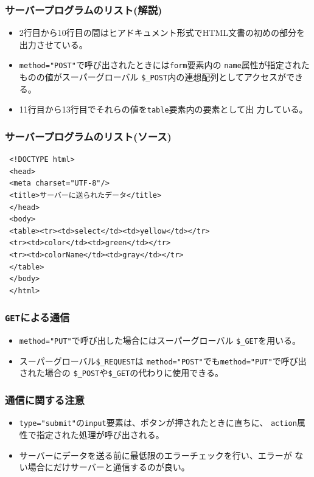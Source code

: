  \begin{frame}[containsverbatim]
 \frametitle{サーバープログラムのリスト(解説)}
 \begin{itemize}
 \item 2行目から10行目の間はヒアドキュメント形式でHTML文書の初めの部分を
       出力させている。
 \item \verb+method="POST"+で呼び出されたときには\texttt{form}要素内の
       \texttt{name}属性が指定されたものの値がスーパーグローバル
       \verb+$_POST+内の連想配列としてアクセスができる。
 \item 11行目から13行目でそれらの値を\texttt{table}要素内の要素として出
       力している。
 \end{itemize}
 \end{frame}
 \begin{frame}[containsverbatim]
 \frametitle{サーバープログラムのリスト(ソース)}
 \begin{Verbatim}
 <!DOCTYPE html>
 <head>
 <meta charset="UTF-8"/>
 <title>サーバーに送られたデータ</title>
 </head>
 <body>
 <table><tr><td>select</td><td>yellow</td></tr>
 <tr><td>color</td><td>green</td></tr>
 <tr><td>colorName</td><td>gray</td></tr>
 </table>
 </body>
 </html>
 \end{Verbatim}
 \end{frame}
 \begin{frame}[containsverbatim]
 \frametitle{\texttt{GET}による通信}
 \begin{itemize}
 \item \Verb+method="PUT"+で呼び出した場合にはスーパーグローバル
 \Verb+$_GET+を用いる。
 \item スーパーグローバル\Verb+$_REQUEST+は
 \Verb+method="POST"+でも\Verb+method="PUT"+で呼び出された場合の
 \Verb+$_POST+や\verb+$_GET+の代わりに使用できる。
 \end{itemize}
 \end{frame}
 \begin{frame}[containsverbatim]
 \frametitle{通信に関する注意}
 \begin{itemize}
 \item \Verb+type="submit"+の\texttt{input}要素は、ボタンが押されたときに直ちに、
 \texttt{action}属性で指定された処理が呼び出される。
 \item サーバーにデータを送る前に最低限のエラーチェックを行い、エラーが
       ない場合にだけサーバーと通信するのが良い。
 \end{itemize}
 \end{frame}
